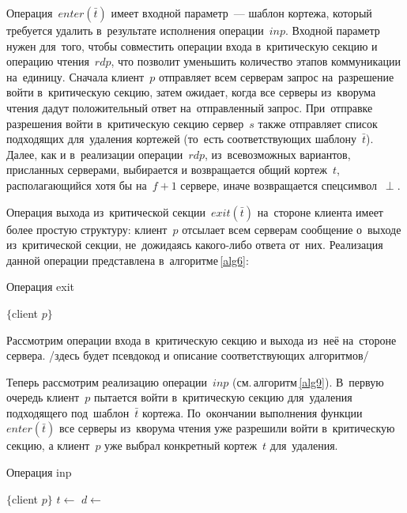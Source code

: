 Операция~$enter(\bar t)$ имеет входной параметр~--- шаблон кортежа, который требуется удалить в~результате исполнения операции~$inp$. Входной параметр нужен для~того, чтобы совместить операции входа в~критическую секцию и операцию чтения~$rdp$, что позволит уменьшить количество этапов коммуникации на~единицу. Сначала клиент~$p$ отправляет всем серверам запрос на~разрешение войти в~критическую секцию, затем ожидает, когда все серверы из~кворума чтения дадут положительный ответ на~отправленный запрос. При~отправке разрешения войти в~критическую секцию сервер~$s$ также отправляет список подходящих для~удаления кортежей (то~есть соответствующих шаблону~$\bar t$). Далее, как и в~реализации операции~$rdp$, из~всевозможных вариантов, присланных серверами, выбирается и возвращается общий кортеж~$t$, располагающийся хотя бы на~$f + 1$ сервере, иначе возвращается спецсимвол~$\perp$.

Операция выхода из~критической секции~$exit(\bar t)$ на~стороне клиента имеет более простую структуру: клиент~$p$ отсылает всем серверам сообщение о~выходе из~критической секции, не~дожидаясь какого-либо ответа от~них. Реализация данной операции представлена в~алгоритме\,\ref{alg6}:

\begin{algorithm}[H]
	\caption{Операция exit}\label{alg6}
	\begin{algorithmic}[1]
		\Statex $\{$client $p \}$
		\State {}
		\EndFor
		\EndProcedure
	\end{algorithmic}
\end{algorithm}

Рассмотрим операции входа в~критическую секцию и выхода из~неё на~стороне сервера. /здесь будет псевдокод и описание соответствующих алгоритмов/

Теперь рассмотрим реализацию операции~$inp$ (см.\,алгоритм\,\ref{alg9}). В~первую очередь клиент~$p$ пытается войти в~критическую секцию для~удаления подходящего под~шаблон~$\bar t$ кортежа. По~окончании выполнения функции~$enter(\bar t)$ все серверы из~кворума чтения уже разрешили войти в~критическую секцию, а клиент~$p$ уже выбрал конкретный кортеж~$t$ для~удаления.

\begin{algorithm}[H]
	\caption{Операция inp}\label{alg9}
	\begin{algorithmic}[1]
		\Statex $\{$client $p \}$
		\Repeat
			\State $t \gets$ 
				\State {}
				\State \Return{$\perp$}
			\EndIf
			\State $d \gets$ 
			\State {}
		\State {}
		\EndFunction
	\end{algorithmic}
\end{algorithm}

